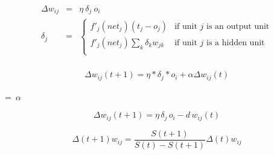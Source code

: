 {\newpage
\clearpage
\samepage {}
}

{\newpage
\clearpage
\samepage {}
}

{\newpage
\clearpage
\samepage \framebox[1.2cm][c]{$\vphantom{/} < \vphantom{/}$}
}

{\newpage
\clearpage
\samepage \framebox[1.2cm][c]{$\vphantom{/} > \vphantom{/}$}
}

{\newpage
\clearpage
\samepage \framebox[1.2cm][c]{$\vphantom{/} \ll \vphantom{/}$}
}

{\newpage
\clearpage
\samepage \framebox[1.2cm][c]{$\vphantom{/} \gg \vphantom{/}$}
}

{\newpage
\clearpage
\samepage {}
}

{\newpage
\clearpage
\samepage \begin{eqnarray*}\Delta w_{ij} & = & \eta \  \delta_{j} \  o_{i}\\ 
        \delta_{j}    & = & \left\{
        \begin{array}{ll}
        f'_{j}(net_{j})(t_{j} - o_{j}) &
        \mbox{if unit $j$ is an output unit}\\ 
        f'_{j}(net_{j}) \sum_{k} \delta_{k} w_{jk} & 
         \mbox{if unit $j$ is a hidden unit}\\ 
        \end{array}
        \right. \\ 
\end{eqnarray*}
}

{\newpage
\clearpage
\samepage \begin{eqnarray*}%
\Delta w_{ij}(t+1) = 
        \eta * \delta_{j} * o_{i} + \alpha \Delta w_{ij}(t) 
\end{eqnarray*}
}

{\newpage
\clearpage
\samepage \setbox\sizebox=\hbox{%
$\alpha$}\box\sizebox
}

{\newpage
\clearpage
\samepage \begin{displaymath}\Delta w_{ij} (t + 1) = \eta\, \delta_j\, o_i - d\, w_{ij}(t)
\end{displaymath}
}

{\newpage
\clearpage
\samepage \begin{displaymath}\Delta(t+1) w_{ij} = \frac{S(t+1)}{S(t)-S(t+1)} \Delta(t) w_{ij} 
\end{displaymath}
}

